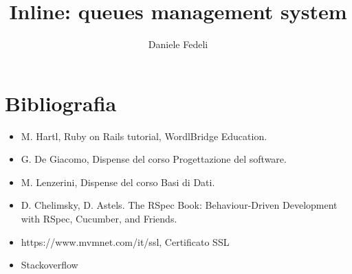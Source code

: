 \documentclass[Lau,binding=0.6cm,noexaminfo,italian]{sapthesis}
\title{Inline: queues management system}
\author{Daniele Fedeli}
\begin{document}
	
	\frontmatter
	
	\maketitle
	
	\dedication{"Il computer non è una macchina intelligente che aiuta le persone stupide, anzi, è una macchina stupida che funziona solo nelle mani delle persone intelligenti."	
	Umberto Eco}

	{\tableofcontents}
	\listoffigures
	\listoftables
	\mainmatter

	
	
	
	
	
	
	
	
	\chapter*{Bibliografia}
	\begin{itemize}
		\item M. Hartl, Ruby on Rails tutorial, WordlBridge Education.
		\item G. De Giacomo, Dispense del corso Progettazione del software.
		\item M. Lenzerini, Dispense del corso Basi di Dati.
		\item D. Chelimsky, D. Astels. The RSpec Book: Behaviour-Driven Development with RSpec, Cucumber, and Friends.
		\item https://www.mvmnet.com/it/ssl, Certificato SSL
		\item Stackoverflow
	\end{itemize}
	\backmatter
	\cleardoublepage
\end{document}
